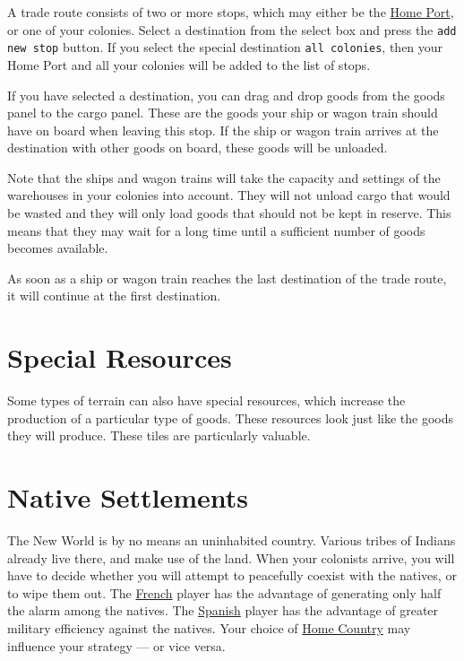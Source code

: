\documentclass[12pt]{book}
\begin{document}
A trade route consists of two or more stops, which may either be the
\hyperlink{Home Port}{Home Port}, or one of your colonies. Select a
destination from the select box and press the \texttt{add new stop}
button. If you select the special destination \texttt{all colonies},
then your Home Port and all your colonies will be added to the list of
stops.

If you have selected a destination, you can drag and drop goods from
the goods panel to the cargo panel. These are the goods your ship or
wagon train should have on board when leaving this stop. If the ship
or wagon train arrives at the destination with other goods on board,
these goods will be unloaded.

Note that the ships and wagon trains will take the capacity and
settings of the warehouses in your colonies into account. They will
not unload cargo that would be wasted and they will only load goods
that should not be kept in reserve. This means that they may wait
for a long time until a sufficient number of goods becomes available.

As soon as a ship or wagon train reaches the last destination of the
trade route, it will continue at the first destination.


\hypertarget{Resources}{\section{Special Resources}}

Some types of terrain can also have special resources, which increase
the production of a particular type of goods. These resources look
just like the goods they will produce. These tiles are particularly
valuable.


\hypertarget{Native Settlements}{\section{Native Settlements}}

The New World is by no means an uninhabited country. Various tribes of
Indians already live there, and make use of the land. When your
colonists arrive, you will have to decide whether you will attempt to
peacefully coexist with the natives, or to wipe them out. The
\hyperlink{France}{French} player has the advantage of generating only
half the alarm among the natives. The \hyperlink{Spain}{Spanish}
player has the advantage of greater military efficiency against the
natives. Your choice of \hyperlink{Home Country}{Home Country} may
influence your strategy --- or vice versa.
\end{document}
